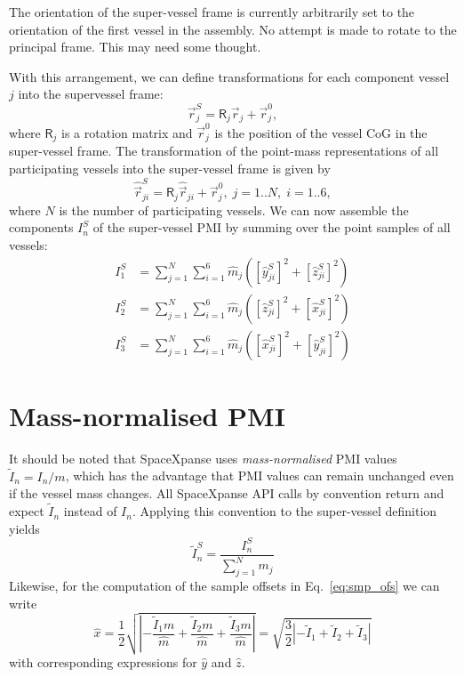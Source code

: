 \documentclass[a4paper]{article}
\newcommand\mat[1]{\mathsf{#1}}
\begin{document}
The orientation of the super-vessel frame is currently arbitrarily set to the orientation of the first vessel in the assembly. No attempt is made to rotate to the principal frame. This may need some thought.

With this arrangement, we can define transformations for each component vessel $j$ into the supervessel frame:
\begin{equation}
  \vec{r}_j^S = \mat{R}_j \vec{r}_j + \vec{r}_j^0,
\end{equation}
where $\mat{R}_j$ is a rotation matrix and $\vec{r}_j^0$ is the position of the vessel CoG in the super-vessel frame.
The transformation of the point-mass representations of all participating vessels into the super-vessel frame is given by
\begin{equation}
\hat{\vec{r}}_{ji}^S = \mat{R}_j \hat{\vec{r}}_{ji} + \vec{r}_j^0, \; j=1..N, \; i=1..6,
\end{equation}
where $N$ is the number of participating vessels.
We can now assemble the components $I_n^S$ of the super-vessel PMI by summing over the point samples of all vessels:
\begin{equation}
\begin{split}
I_1^S & = \sum_{j=1}^N \sum_{i=1}^6 \hat m_j ([\hat y_{ji}^S]^2 + [\hat z_{ji}^S]^2)\\
I_2^S & = \sum_{j=1}^N \sum_{i=1}^6 \hat m_j ([\hat z_{ji}^S]^2 + [\hat x_{ji}^S]^2)\\
I_3^S & = \sum_{j=1}^N \sum_{i=1}^6 \hat m_j ([\hat x_{ji}^S]^2 + [\hat y_{ji}^S]^2)
\end{split}
\end{equation}

\section{Mass-normalised PMI}
It should be noted that SpaceXpanse uses \emph{mass-normalised} PMI values $\tilde I_n = I_n/m$, which has the advantage that PMI values can remain unchanged even if the vessel mass changes. All SpaceXpanse API calls by convention return and expect $\tilde I_n$ instead of $I_n$. Applying this convention to the super-vessel definition yields
\begin{equation}
\tilde{I}_n^S = \frac{I_n^S}{\sum_{j=1}^N m_j}
\end{equation}
Likewise, for the computation of the sample offsets in Eq.~\ref{eq:smp_ofs} we can write
\begin{equation}
  \hat x = \frac{1}{2} \sqrt{\left| -\frac{\tilde{I}_1 m}{\hat m} + \frac{\tilde{I}_2 m}{\hat m} + \frac{\tilde{I}_3 m}{\hat m} \right|} =
  \sqrt{\frac{3}{2} \left| -\tilde{I}_1 + \tilde{I}_2 + \tilde{I}_3 \right|}
\end{equation}
with corresponding expressions for $\hat y$ and $\hat z$.
\end{document}
